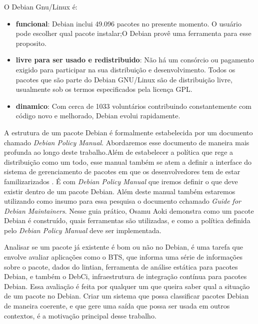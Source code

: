 O Debian Gnu/Linux é:
        \begin{itemize}
        \item \textbf{funcional}: Debian inclui 49.096 pacotes no presente momento. O usuário
        pode escolher qual pacote instalar;O Debian provê uma ferramenta para esse proposito.\cite{Debian}

        \item \textbf{livre para ser usado e redistribuido}: Não há um consórcio ou pagamento exigido para participar na sua distribuição e desenvolvimento.
        Todos os pacotes que são parte do Debian GNU/Linux são de distribuição livre, usualmente sob os termos especificados pela licença GPL.\cite{Debian}

        \item \textbf{dinamico}: Com cerca de 1033 voluntários contribuindo constantemente com código novo e melhorado, Debian evolui rapidamente.\cite{Debian}
        \end{itemize}


        A estrutura de um pacote Debian é formalmente estabelecida por um documento chamado \textit {Debian Policy Manual}. Abordaremos esse documento de maneira mais profunda ao longo deste trabalho.Além de estabelecer a política que rege a distribuição como um todo,  esse manual também se atem a definir a interface do sistema de gerenciamento de pacotes em que os desenvolvedores tem de estar familizarizados \cite{Guide}. É com \textit {Debian Policy Manual} que iremos definir o que deve existir dentro de um pacote Debian. Além deste manual também estaremos utilizando como insumo para essa pesquisa o documento cchamado \textit{Guide for Debian Maintainers}. Nesse guia prático, Osamu Aoki demonstra como um pacote Debian é construído, quais ferramentas são utilizadas, e como a política definida pelo \textit{Debian Policy Manual} deve ser implementada.
        

        Analisar se um pacote já existente é bom ou não no Debian, é uma tarefa que envolve avaliar aplicações como o BTS, que informa uma série de informações sobre o pacote, dados do lintian, ferramenta de análise estática para pacotes Debian, e também o DebCi, infraestrutura de integração contínua para pacotes Debian. Essa avaliação é feita por qualquer um que queira saber qual a situação de um pacote no Debian. Criar um sistema que possa classificar pacotes Debian de maneira coerente, e que gere uma saída que possa ser usada em outros contextos, é a motivação principal desse trabalho.


